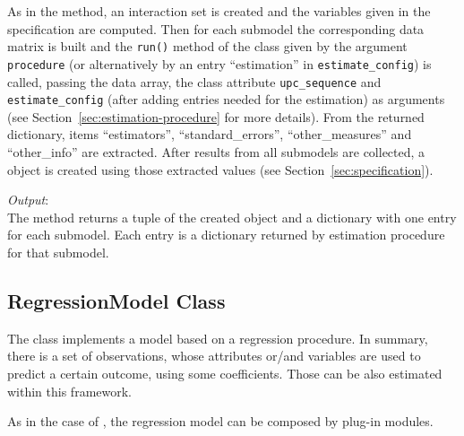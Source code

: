 {As in the  method, an interaction set is created and the
variables \variablesindex given in the specification are computed. Then for each submodel the
corresponding data matrix is built and the \verb|run()| method of the class
given by the argument \verb|procedure| (or alternatively by an entry
``estimation'' in \verb|estimate_config|) is called, passing the data array,
the class attribute \attributesindex \verb|upc_sequence| and \verb|estimate_config| (after
adding entries needed for the estimation) as arguments (see
Section~\ref{sec:estimation-procedure} for more details).  From the returned
dictionary, items ``estimators'', ``standard_errors'', ``other_measures'' and
``other_info'' are extracted. After results from all submodels are collected,
a  \coefficientsindex object is created using those extracted values (see Section~\ref{sec:specification}).

{\it Output}:~\\[1mm]
The method returns a tuple of the created  \coefficientsindex object and a
dictionary with one entry for each submodel. 
Each entry is a dictionary returned by estimation procedure for that submodel.

\subsection{RegressionModel Class}
%
\label{sec:regression-model}
The  class implements a model based on a regression
procedure. In summary, there is a set of observations, whose attributes \attributesindex or/and
variables \variablesindex are used to predict a certain outcome, using some coefficients. \coefficientsindex
Those can be also estimated within this framework.

As in the case of , the regression model can be composed by
plug-in modules.

}
